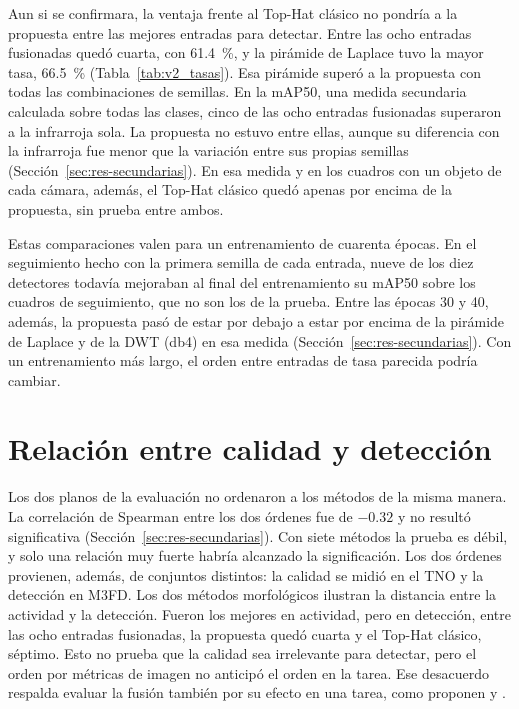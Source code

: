 Aun si se confirmara, la ventaja frente al Top-Hat clásico no pondría a la propuesta entre las mejores
entradas para detectar. Entre las ocho entradas fusionadas quedó cuarta, con 61.4~\%, y la pirámide de Laplace
tuvo la mayor tasa, 66.5~\% (Tabla~\ref{tab:v2_tasas}). Esa pirámide superó a la propuesta con todas las
combinaciones de semillas. En la mAP50, una medida secundaria calculada sobre todas las clases, cinco de
las ocho entradas fusionadas superaron a la infrarroja sola. La propuesta no estuvo entre ellas, aunque
su diferencia con la infrarroja fue menor que la variación entre sus propias semillas
(Sección~\ref{sec:res-secundarias}). En esa medida y en los cuadros con un objeto de cada cámara,
además, el Top-Hat clásico quedó apenas por encima de la propuesta, sin prueba entre ambos.

Estas comparaciones valen para un entrenamiento de cuarenta épocas. En el seguimiento hecho con la
primera semilla de cada entrada, nueve de los diez detectores todavía mejoraban al final del
entrenamiento su mAP50 sobre los cuadros de seguimiento, que no son los de la prueba. Entre las épocas 30 y 40, además, la propuesta pasó de estar por debajo a estar por encima
de la pirámide de Laplace y de la DWT (db4) en esa medida (Sección~\ref{sec:res-secundarias}). Con un
entrenamiento más largo, el orden entre entradas de tasa parecida podría cambiar.

\section{Relación entre calidad y detección}
\label{sec:disc-relacion}

Los dos planos de la evaluación no ordenaron a los métodos de la misma manera. La correlación de Spearman
entre los dos órdenes fue de $-0.32$ y no resultó significativa (Sección~\ref{sec:res-secundarias}).
Con siete métodos la prueba es débil, y solo una relación muy fuerte habría alcanzado la significación.
Los dos órdenes provienen, además, de conjuntos distintos: la calidad se midió en el TNO y la detección
en M3FD. Los dos métodos morfológicos ilustran la distancia entre la actividad y la detección. Fueron
los mejores en actividad, pero en detección, entre las ocho entradas fusionadas, la propuesta quedó
cuarta y el Top-Hat clásico, séptimo. Esto no prueba que la calidad sea irrelevante para detectar, pero
el orden por métricas de imagen no anticipó el orden en la tarea. Ese desacuerdo respalda evaluar la
fusión también por su efecto en una tarea, como proponen \textcite{liu2022} y \textcite{tang2022}.

